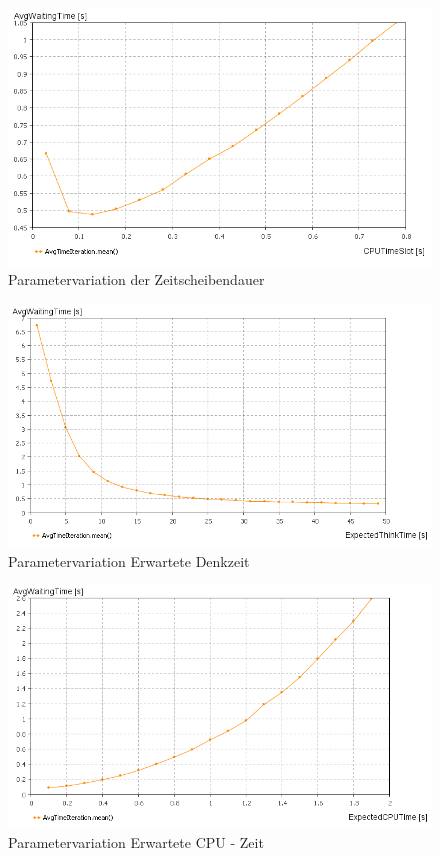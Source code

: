 \documentclass[
a4paper,   
headsepline, 
fleqn,     
11pt
]{scrartcl}
\begin{document}
\begin{figure}[h]
  \centering
  \includegraphics[width=1\textwidth]{./images/ParameterVariationCPUTimeSlot_1}
  \caption{Parametervariation der Zeitscheibendauer}
  \label{fig:ParametervariationB-02}
\end{figure}

\begin{figure}[h]
  \centering
  \includegraphics[width=1\textwidth]{./images/ParameterVariationExpectedThinkTime}
  \caption{Parametervariation Erwartete Denkzeit}
  \label{fig:ThinkTime}
\end{figure}

\begin{figure}[h]
  \centering
  \includegraphics[width=1\textwidth]{./images/ParameterVariationExpectedCPUTime}
  \caption{Parametervariation Erwartete CPU - Zeit}
  \label{fig:CPUTime}
\end{figure}
\end{document}
